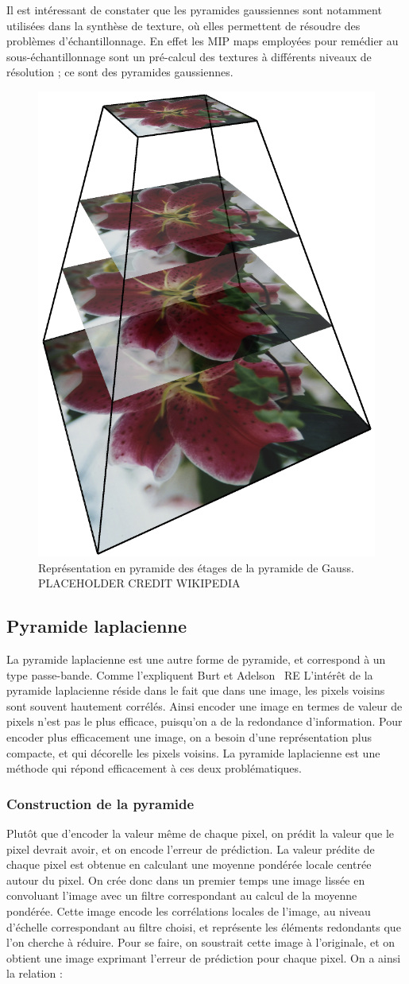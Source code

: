 Il est intéressant de constater que les pyramides gaussiennes sont notamment utilisées dans la synthèse de texture, où elles permettent de résoudre des problèmes d'échantillonnage. En effet les MIP maps employées pour remédier au sous-échantillonnage sont un pré-calcul des textures à différents niveaux de résolution ; ce sont des pyramides gaussiennes.

\begin{figure}
    \centering
    \includegraphics[width=.25\textwidth]{contenu/resources/images/image_pyramid_placeholder}
    \caption[Représentation pyramidale des étages de la pyramide de Gauss]{Représentation en pyramide des étages de la pyramide de Gauss. {\color{red}PLACEHOLDER CREDIT WIKIPEDIA}}
    \label{fig:pyramid-gauss}
\end{figure}

\subsection{Pyramide laplacienne}

La pyramide laplacienne est une autre forme de pyramide, et correspond à un type passe-bande. Comme l'expliquent Burt et Adelson~\cite{burt_laplacian_1983} RE L'intérêt de la pyramide laplacienne réside dans le fait que dans une image, les pixels voisins sont souvent hautement corrélés. Ainsi encoder une image en termes de valeur de pixels n'est pas le plus efficace, puisqu'on a de la redondance d'information. Pour encoder plus efficacement une image, on a besoin d'une représentation plus compacte, et qui décorelle les pixels voisins. La pyramide laplacienne est une méthode qui répond efficacement à ces deux problématiques.

\subsubsection{Construction de la pyramide}

Plutôt que d'encoder la valeur même de chaque pixel, on prédit la valeur que le pixel devrait avoir, et on encode l'erreur de prédiction. La valeur prédite de chaque pixel est obtenue en calculant une moyenne pondérée locale centrée autour du pixel. On crée donc dans un premier temps une image lissée en convoluant l'image avec un filtre correspondant au calcul de la moyenne pondérée. Cette image encode les corrélations locales de l'image, au niveau d'échelle correspondant au filtre choisi, et représente les éléments redondants que l'on cherche à réduire. Pour se faire, on soustrait cette image à l'originale, et on obtient une image exprimant l'erreur de prédiction pour chaque pixel. On a ainsi la relation :

